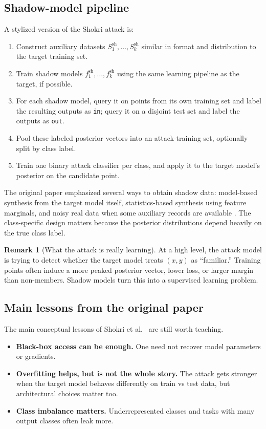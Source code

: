 \documentclass[11pt]{article}
\theoremstyle{definition}
\newtheorem{remark}[theorem]{Remark}
\newcommand{\1}{\mathbf{1}}
\begin{document}
\subsection{Shadow-model pipeline}

A stylized version of the Shokri attack is:
\begin{enumerate}
    \item Construct auxiliary datasets $S_1^{\mathrm{sh}},\dots,S_k^{\mathrm{sh}}$ similar in format and distribution to the target training set.
    \item Train shadow models $f_1^{\mathrm{sh}},\dots,f_k^{\mathrm{sh}}$ using the same learning pipeline as the target, if possible.
    \item For each shadow model, query it on points from its own training set and label the resulting outputs as \texttt{in}; query it on a disjoint test set and label the outputs as \texttt{out}.
    \item Pool these labeled posterior vectors into an attack-training set, optionally split by class label.
    \item Train one binary attack classifier per class, and apply it to the target model's posterior on the candidate point.
\end{enumerate}

The original paper emphasized several ways to obtain shadow data: model-based synthesis from the target model itself, statistics-based synthesis using feature marginals, and noisy real data when some auxiliary records are available \cite{shokri2017}. The class-specific design matters because the posterior distributions depend heavily on the true class label.

\begin{remark}[What the attack is really learning]
At a high level, the attack model is trying to detect whether the target model treats $(x,y)$ as ``familiar.'' Training points often induce a more peaked posterior vector, lower loss, or larger margin than non-members. Shadow models turn this into a supervised learning problem.
\end{remark}

\subsection{Main lessons from the original paper}

The main conceptual lessons of Shokri et al.~\cite{shokri2017} are still worth teaching.
\begin{itemize}
    \item \textbf{Black-box access can be enough.} One need not recover model parameters or gradients.
    \item \textbf{Overfitting helps, but is not the whole story.} The attack gets stronger when the target model behaves differently on train vs test data, but architectural choices matter too.
    \item \textbf{Class imbalance matters.} Underrepresented classes and tasks with many output classes often leak more.
\end{itemize}
\end{document}
